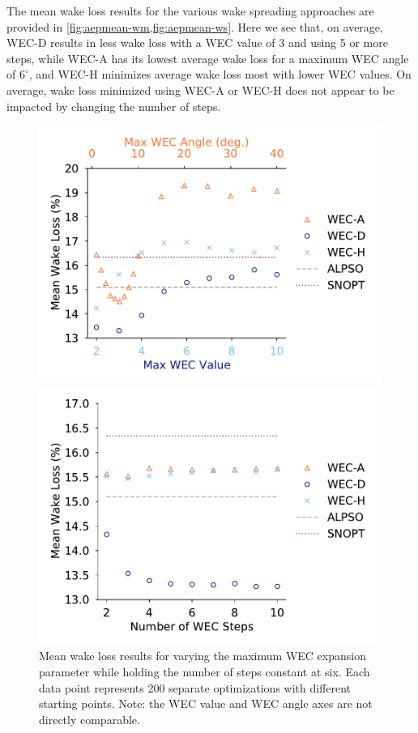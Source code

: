 \documentclass{jpconf}
\begin{document}
The mean wake loss results for the various wake spreading approaches are provided in \cref{fig:aepmean-wm,fig:aepmean-ws}. Here we see that, on average, WEC-D results in less wake loss with a WEC value of 3 and using 5 or more steps, while WEC-A has its lowest average wake loss for a maximum WEC angle of $6^\circ$, and WEC-H minimizes average wake loss most with lower WEC values. On average, wake loss minimized using WEC-A or WEC-H does not appear to be impacted by changing the number of steps.
%
\begin{figure}[ht]
	\centering
	\begin{minipage}[t]{0.47\textwidth}
		\centering
		\includegraphics[width=\textwidth, trim={0cm 0cm 0cm 0cm}, clip]{tests/maxwec_const_nsteps6_mean}
		\caption{Mean wake loss results for varying the maximum WEC expansion parameter while holding the number of steps constant at six. Each data point represents 200 separate optimizations with different starting points. Note: the WEC value and WEC angle axes are not directly comparable.}
		\label{fig:aepmean-wm}
	\end{minipage}\hspace{1pc}
	\begin{minipage}[t]{0.47\textwidth}
		\centering
		\includegraphics[width=\textwidth]{tests/nsteps_const_maxwec_mean}

\end{minipage}
\end{figure}
\end{document}
